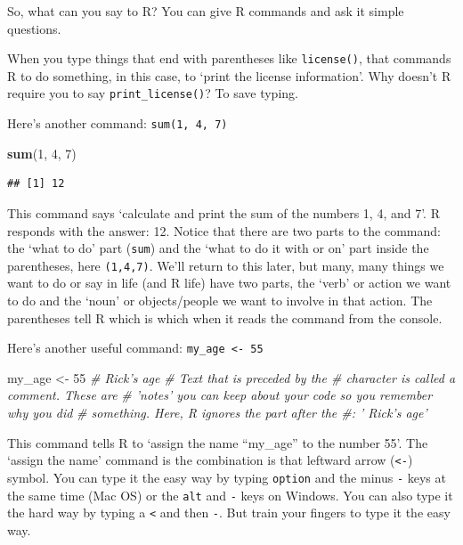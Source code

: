 \documentclass[]{article}
\newenvironment{Shaded}{\begin{snugshade}}{\end{snugshade}}
\newcommand{\KeywordTok}[1]{\textcolor[rgb]{0.13,0.29,0.53}{\textbf{#1}}}
\newcommand{\DecValTok}[1]{\textcolor[rgb]{0.00,0.00,0.81}{#1}}
\newcommand{\StringTok}[1]{\textcolor[rgb]{0.31,0.60,0.02}{#1}}
\newcommand{\CommentTok}[1]{\textcolor[rgb]{0.56,0.35,0.01}{\textit{#1}}}
\newcommand{\NormalTok}[1]{#1}
\begin{document}
So, what can you say to R? You can give R commands and ask it simple
questions.

When you type things that end with parentheses like \texttt{license()},
that commands R to do something, in this case, to `print the license
information'. Why doesn't R require you to say
\texttt{print\_license()}? To save typing.

Here's another command: \texttt{sum(1,\ 4,\ 7)}

\begin{Shaded}
\begin{Highlighting}[]
\KeywordTok{sum}\NormalTok{(}\DecValTok{1}\NormalTok{, }\DecValTok{4}\NormalTok{, }\DecValTok{7}\NormalTok{)}
\end{Highlighting}
\end{Shaded}

\begin{verbatim}
## [1] 12
\end{verbatim}

This command says `calculate and print the sum of the numbers 1, 4, and
7'. R responds with the answer: 12. Notice that there are two parts to
the command: the `what to do' part (\texttt{sum}) and the `what to do it
with or on' part inside the parentheses, here \texttt{(1,4,7)}. We'll
return to this later, but many, many things we want to do or say in life
(and R life) have two parts, the `verb' or action we want to do and the
`noun' or objects/people we want to involve in that action. The
parentheses tell R which is which when it reads the command from the
console.

Here's another useful command: \texttt{my\_age\ \textless{}-\ 55}

\begin{Shaded}
\begin{Highlighting}[]
\NormalTok{my_age <-}\StringTok{ }\DecValTok{55}  \CommentTok{# Rick's age}
\CommentTok{# Text that is preceded by the # character is called a comment.  These are}
\CommentTok{# 'notes' you can keep about your code so you remember why you did}
\CommentTok{# something. Here, R ignores the part after the #: ' Rick's age'}
\end{Highlighting}
\end{Shaded}

This command tells R to `assign the name ``my\_age'' to the number 55'.
The `assign the name' command is the combination is that leftward arrow
(\texttt{\textless{}-}) symbol. You can type it the easy way by typing
\texttt{option} and the minus \texttt{-} keys at the same time (Mac OS)
or the \texttt{alt} and \texttt{-} keys on Windows. You can also type it
the hard way by typing a \texttt{\textless{}} and then \texttt{-}. But
train your fingers to type it the easy way.
\end{document}
